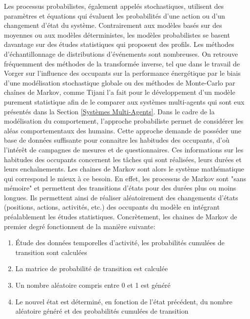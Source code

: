 Les processus probabilistes, également appelés stochastiques, utilisent des paramètres et équations qui évaluent les probabilités d'une action ou d'un changement d'état du système. Contrairement aux modèles basés sur des moyennes ou aux modèles déterministes, les modèles probabilistes se basent davantage sur des études statistiques qui proposent des profils. Les méthodes d'échantillonnage de distributions d'événements sont nombreuses. On retrouve fréquemment des méthodes de la transformée inverse, tel que dans le travail de Vorger sur l'influence des occupants sur la performance énergétique par le biais d'une modélisation stochastique globale \cite{Vorger-14} ou des méthodes de Monte-Carlo par chaînes de Markov, comme Tijani l'a fait pour le développement d'un modèle purement statistique \cite{Tijani-14} afin de le comparer aux systèmes multi-agents qui sont eux présentés dans la Section \ref{Systèmes Multi-Agents}. Dans le cadre de la modélisation du comportement, l'approche probabiliste permet de considérer les aléas comportementaux des humains. Cette approche demande de posséder une base de données suffisante pour connaitre les habitudes des occupants, d'où l'intérêt de campagnes de mesures et de questionnaires. Ces informations sur les habitudes des occupants concernent les tâches qui sont réalisées, leurs durées et leurs enchaînements. Les chaines de Markov sont alors le système mathématique qui correspond le mieux à ce besoin. En effet, les processus de Markov sont "sans mémoire" et permettent des transitions d'états pour des durées plus ou moins longues. Ils permettent ainsi de réaliser aléatoirement des changements d'états (positions, actions, activités, etc.) des occupants du modèle en intégrant préalablement les études statistiques. Concrètement, les chaines de Markov de premier degré fonctionnent de la manière suivante:
\begin{enumerate}
\renewcommand{\arraystretch}{0}
\item Étude des données temporelles d'activité, les probabilités cumulées de transition sont calculées
\item La matrice de probabilité de transition est calculée
\item Un nombre aléatoire compris entre 0 et 1 est généré
\item Le nouvel état est déterminé, en fonction de l'état précédent, du nombre aléatoire généré et des probabilités cumulées de transition
\end{enumerate}
